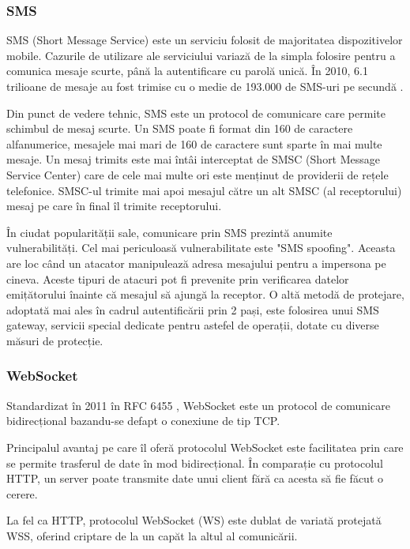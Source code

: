 \documentclass[12pt]{article}
\begin{document}
\subsubsection{SMS}

SMS (Short Message Service) este un serviciu folosit de majoritatea dispozitivelor mobile. Cazurile de 
utilizare ale serviciului variază de la simpla folosire pentru a comunica mesaje scurte, până la 
autentificare cu parolă unică. În 2010, 6.1 trilioane de mesaje au fost trimise cu o medie de 193.000 de SMS-uri
pe secundă \cite{riseof3g}. 


Din punct de vedere tehnic, SMS este un protocol de comunicare care permite schimbul de mesaj scurte. Un SMS 
poate fi format din 160 de caractere alfanumerice, mesajele mai mari de 160 de caractere sunt sparte în 
mai multe mesaje. 
Un mesaj trimits este mai întâi interceptat de SMSC (Short Message Service Center) care de cele mai multe ori
este menținut de providerii de rețele telefonice. SMSC-ul trimite mai apoi mesajul către un alt SMSC (al receptorului)
mesaj pe care în final îl trimite receptorului.

În ciudat popularității sale, comunicare prin SMS prezintă
anumite vulnerabilități. Cel mai periculoasă vulnerabilitate 
este "SMS spoofing". Aceasta are loc când un atacator manipulează
adresa mesajului pentru a impersona pe cineva. Aceste tipuri de
atacuri pot fi prevenite prin verificarea datelor emițătorului 
înainte că mesajul să ajungă la receptor. O altă metodă de protejare,
adoptată mai ales în cadrul autentificării prin 2 pași, este folosirea unui
SMS gateway, servicii special dedicate pentru astefel de operații, dotate
cu diverse măsuri de protecție.

\subsubsection{WebSocket}

Standardizat în 2011 în RFC 6455 \cite{fette2011websocket}, WebSocket este
un protocol de comunicare bidirecțional bazandu-se defapt o conexiune de tip TCP.

Principalul avantaj pe care îl oferă protocolul WebSocket este facilitatea
prin care se permite trasferul de date în mod bidirecțional. În comparație cu protocolul HTTP,
un server poate transmite date unui client fără ca acesta să fie făcut o cerere.

La fel ca HTTP, protocolul WebSocket (WS) este dublat de variată protejată WSS, oferind
criptare de la un capăt la altul al comunicării.
\end{document}
